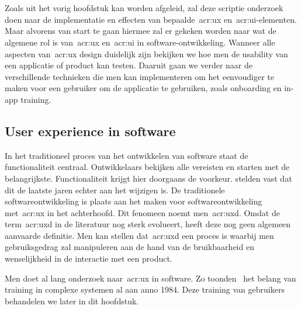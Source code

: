\chapter{}
\label{ch:stand-van-zaken}


Zoals uit het vorig hoofdstuk kan worden afgeleid, zal deze scriptie onderzoek doen naar de implementatie en effecten van bepaalde~\acrshort{acr:ux} en~\acrshort{acr:ui}-elementen. Maar alvorens van start te gaan hiermee zal er gekeken worden naar wat de algemene rol is van~\acrshort{acr:ux} en~\acrshort{acr:ui} in software-ontwikkeling. Wanneer alle aspecten van~\acrshort{acr:ux} design duidelijk zijn bekijken we hoe men de usability van een applicatie of product kan testen. Daaruit gaan we verder naar de verschillende technieken die men kan implementeren om het eenvoudiger te maken voor een gebruiker om de applicatie te gebruiken, zoals onboarding en in-app training.

\section{User experience in software}
\label{sec:user-experience-in-software}

In het traditioneel proces van het ontwikkelen van software staat de functionaliteit centraal. Ontwikkelaars bekijken alle vereisten en starten met de belangrijkste. Functionaliteit krijgt hier doorgaans de voorkeur. \textcite{Harutyunyan2019} stelden vast dat dit de laatste jaren echter aan het wijzigen is. De traditionele softwareontwikkeling is plaats aan het maken voor softwareontwikkeling met~\acrlong{acr:ux} in het achterhoofd. Dit fenomeen noemt men~\acrfull{acr:uxd}. Omdat de term~\acrshort{acr:uxd} in de literatuur nog sterk evolueert, heeft deze nog geen algemeen aanvaarde definitie. Men kan stellen dat~\acrlong{acr:uxd} een proces is waarbij men gebruiksgedrag zal manipuleren aan de hand van de bruikbaarheid en wenselijkheid in de interactie met een product.

Men doet al lang onderzoek naar~\acrlong{acr:ux} in software. Zo toonden~\textcite{Carroll1984} het belang van training in complexe systemen al aan anno 1984. Deze training van gebruikers behandelen we later in dit hoofdstuk.

